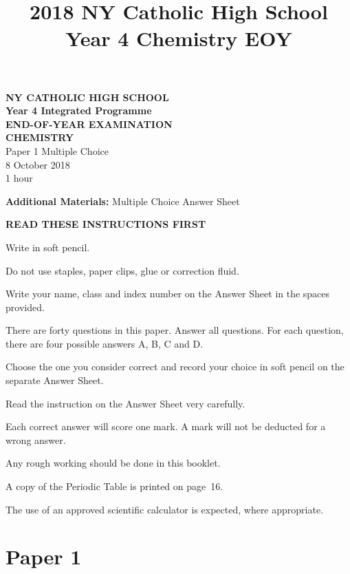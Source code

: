 \documentclass[11pt]{exam}
\title{2018 NY Catholic High School Year 4 Chemistry EOY}
\date{}
\begin{document}
\singlespacing
\setcounter{page}{1}

\begin{center}
{\Large \textbf{NY CATHOLIC HIGH SCHOOL}} \\
{\Large \textbf{Year 4 Integrated Programme}} \\
\vspace{1em}
{\Large \textbf{END-OF-YEAR EXAMINATION}} \\
{\Large \textbf{CHEMISTRY}} \\
\vspace{1em}
{\large Paper 1 Multiple Choice} \\
{\large 8 October 2018} \\
{\large 1 hour} \\
\end{center}

\vspace{1em}
{\bf Additional Materials:} Multiple Choice Answer Sheet

\vspace{0.5em}
{\bf READ THESE INSTRUCTIONS FIRST}

Write in soft pencil.

Do not use staples, paper clips, glue or correction fluid.

Write your name, class and index number on the Answer Sheet in the spaces provided.

There are forty questions in this paper. Answer all questions. For each question, there are four possible answers A, B, C and D.

Choose the one you consider correct and record your choice in soft pencil on the separate Answer Sheet.

Read the instruction on the Answer Sheet very carefully.

Each correct answer will score one mark. A mark will not be deducted for a wrong answer.

Any rough working should be done in this booklet.

A copy of the Periodic Table is printed on page~16.

The use of an approved scientific calculator is expected, where appropriate.

\newpage

\section*{Paper 1}
\end{document}
